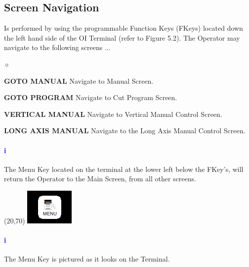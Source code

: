 \subsection{Screen Navigation}Is performed by using the programmable Function Keys (FKeys) located down the left hand side of the OI Terminal (refer to Figure 5.2). The Operator may navigate to the following screens ...
\begin{list}{$\diamond$}{}
	\item \textbf{GOTO MANUAL} Navigate to Manual Screen.
	\item \textbf{GOTO PROGRAM} Navigate to Cut Program Screen.
	\item \textbf{VERTICAL MANUAL} Navigate to Vertical Manual Control Screen.
	\item \textbf{LONG AXIS MANUAL} Navigate to the Long Axis Manual Control Screen.
\end{list}
\paragraph*{\textbf{\LARGE \textcolor{blue}{i}}}
The Menu Key located on the terminal at the lower left below the FKey's, will return the Operator to the Main Screen, from all other screens.\\
\begin{minipage}{4cm}
	\begin{picture}(20,70)
	\includegraphics[width=.5\linewidth]{screen-captures/menu}
	\end{picture}
\end{minipage}\begin{minipage}[]{11cm}
	\paragraph{\textbf{\LARGE \textcolor{blue}{i}}} The Menu Key is pictured as it looks on the Terminal.
\end{minipage}
\pagebreak
\nopagebreak
